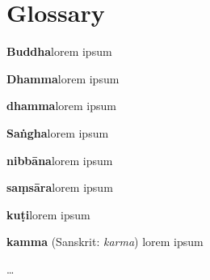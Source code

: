 \chapter*{Glossary}
\parindent 0pt
\parskip 4pt

\textbf{Buddha}\hspace{9pt}lorem ipsum

\textbf{Dhamma}\hspace{9pt}lorem ipsum

\textbf{dhamma}\hspace{9pt}lorem ipsum

\textbf{Saṅgha}\hspace{9pt}lorem ipsum

\textbf{nibbāna}\hspace{9pt}lorem ipsum

\textbf{saṃsāra}\hspace{9pt}lorem ipsum

\textbf{kuṭi}\hspace{9pt}lorem ipsum

\textbf{kamma}\hspace{9pt} (Sanskrit: \emph{karma}) lorem ipsum

\ldots{}

\clearpage
